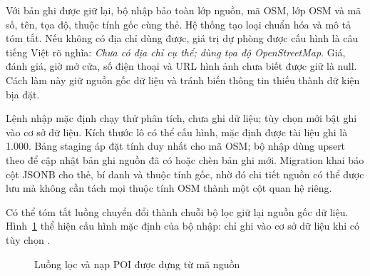 Với bản ghi được giữ lại, bộ nhập bảo toàn lớp nguồn, mã OSM, lớp OSM và mã số, tên, tọa độ, thuộc tính gốc cùng thẻ. Hệ thống tạo loại chuẩn hóa và mô tả tóm tắt. Nếu không có địa chỉ dùng được, giá trị dự phòng được cấu hình là câu tiếng Việt rõ nghĩa: \textit{Chưa có địa chỉ cụ thể; dùng tọa độ OpenStreetMap}. Giá, đánh giá, giờ mở cửa, số điện thoại và URL hình ảnh chưa biết được giữ là null. Cách làm này giữ nguồn gốc dữ liệu và tránh biến thông tin thiếu thành dữ kiện bịa đặt.

Lệnh nhập mặc định chạy thử phân tích, chưa ghi dữ liệu; tùy chọn  mới bật ghi vào cơ sở dữ liệu. Kích thước lô có thể cấu hình, mặc định được tài liệu ghi là 1.000. Bảng staging áp đặt tính duy nhất cho mã OSM; bộ nhập dùng upsert theo  để cập nhật bản ghi nguồn đã có hoặc chèn bản ghi mới. Migration khai báo cột JSONB cho thẻ, bí danh và thuộc tính gốc, nhờ đó chi tiết nguồn có thể được lưu mà không cần tách mọi thuộc tính OSM thành một cột quan hệ riêng.

Có thể tóm tắt luồng chuyển đổi thành chuỗi bộ lọc giữ lại nguồn gốc dữ liệu. Hình~\ref{fig:poi_ingestion_pipeline} thể hiện cấu hình mặc định của bộ nhập: chỉ ghi vào cơ sở dữ liệu khi có tùy chọn .

\begin{figure}[htbp]
    \centering
    \caption{Luồng lọc và nạp POI được dựng từ mã nguồn}
    \label{fig:poi_ingestion_pipeline}
\end{figure}

